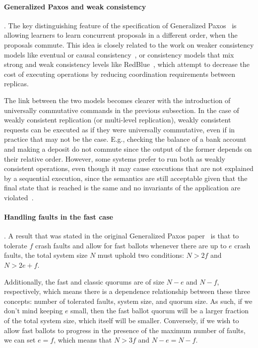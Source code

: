 
\paragraph{Generalized Paxos and weak consistency}.
The key distinguishing feature of the specification of Generalized
Paxos~\cite{Lamport2005} is allowing learners to learn concurrent
proposals in a different order, when the proposals commute. This idea
is closely related to the work on weaker consistency models like eventual or
causal consistency~\cite{Ahamad1995}, or consistency models that mix
strong and weak consistency levels like RedBlue~\cite{Li2012}, which attempt
to decrease the cost of executing operations by reducing coordination
requirements between replicas. 

The link between the two models becomes clearer with the introduction of 
universally commutative commands in the previous subsection.
In the case of weakly consistent replication (or multi-level replication),
weakly consistent requests can be executed as if they were universally
commutative, even if in practice that may not be the case. E.g., checking 
the balance of a bank account and making a deposit do not commute since
the output of the former depends on their relative order. However,
some systems prefer to run both as weakly consistent operations, even
though it may cause executions that are not explained by a sequential
execution, since the semantics are still acceptable given
that the final state that is reached is the same and no invariants 
of the application are violated~\cite{Li2012}.





\paragraph{Handling faults in the fast case}.
A result that was stated in the original Generalized Paxos
paper~\cite{Lamport2005} is that to tolerate $f$ crash faults and
allow for fast ballots whenever there are up to $e$ crash faults, the
total system size $N$ must uphold two conditions:
$N > 2f$ and $N > 2e+f$.

Additionally, the fast and classic quorums are of size $N-e$ and $N-f$, respectively, which means there is a dependence relationship between these three concepts: number of tolerated faults, system size, and quorum size. As such, if we don't mind keeping $e$ small, then the fast ballot quorum will be a larger fraction of the total system size, which itself will be smaller. Conversely, if we wish to allow fast ballots to progress in the presence of the maximum number of faults, we can set $e=f$, which means that $N >3f$ and $N-e=N-f$. 


